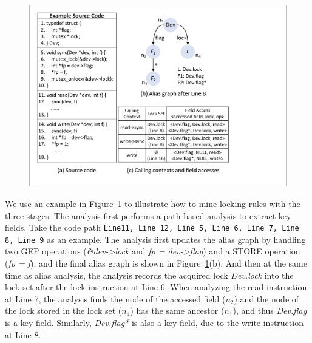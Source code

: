 \begin{figure}[htbp]
	\centering
	\includegraphics[width=1\linewidth]{figures/fig_demo_rule_mining.pdf}
	\label{fig_demo_rule_mining}
\end{figure}

 We use an example in 
Figure~\ref{fig_demo_rule_mining} to illustrate how to mine locking rules with 
the three stages. The analysis first performs a path-based analysis to extract 
key fields. Take the code path {\tt Line11, Line 12, Line 5, Line 6, Line 7, 
Line 8, Line 9} as an example. The analysis first updates the alias graph by 
handling two GEP operations ({\em \&dev->lock} and {\em fp = dev->flag}) and a 
STORE operation ({\em *fp = f}), and the final alias graph is shown in 
Figure~\ref{fig_demo_rule_mining}(b). And then at the same time as alias 
analysis, the analysis records the acquired lock {\em Dev.lock} into the lock 
set after the lock instruction at Line 6. When analyzing the read instruction 
at Line 7, the analysis finds the node of the accessed field ($\mathit{n_2}$) 
and the node of the lock stored in the lock set ($\mathit{n_4}$) has the same 
ancestor ($\mathit{n_1}$), and thus {\em Dev.flag} is a key field. Similarly, 
{\em Dev.flag*} is also a key field, due to the write instruction at Line 8. 

